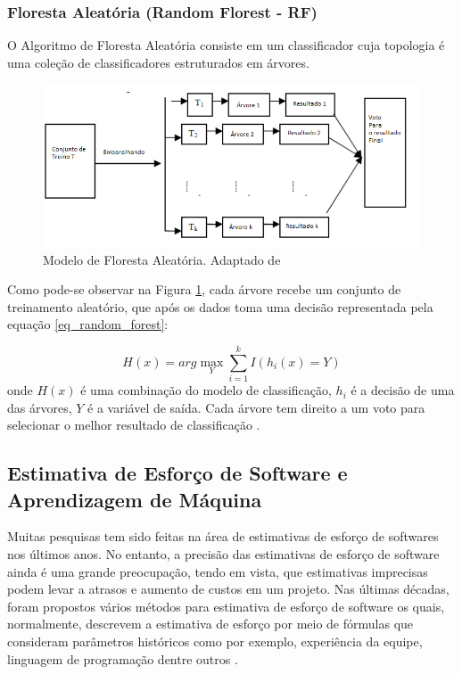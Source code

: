 \documentclass[12pt]{article}
\begin{document}
\subsubsection{Floresta Aleatória (Random Florest - RF)}

O Algoritmo de Floresta Aleatória consiste em um classificador cuja topologia é uma coleção de classificadores estruturados em árvores.

\begin{figure}[h]
  \centering
  \includegraphics[width=.6\textwidth]{img/fig_random_forest.png}
  \caption{Modelo de Floresta Aleatória. Adaptado de \cite{liuetal:2012}}
  \label{fig_random_forest}
\end{figure}

Como pode-se observar na Figura \ref{fig_random_forest}, cada árvore recebe um conjunto de treinamento aleatório, que após os dados toma uma decisão representada pela equação \ref{eq_random_forest}:

\begin{equation}
  H(x) = arg \max_Y \sum_{i = 1}^{k} I (h_i(x) = Y)
  \label{eq_random_forest}
\end{equation}
onde $H(x)$ é uma combinação do modelo de classificação, $h_i$ é a decisão de uma das árvores, $Y$ é a variável de saída. Cada árvore tem direito a um voto para selecionar o melhor resultado de classificação \cite{liuetal:2012}.


\subsection{Estimativa de Esforço de Software e Aprendizagem de Máquina}

Muitas pesquisas tem sido feitas na área de estimativas de esforço de softwares nos últimos anos. No entanto, a precisão das estimativas de esforço de software ainda é uma grande preocupação, tendo em vista, que estimativas imprecisas podem levar a atrasos e aumento de custos em um projeto. Nas últimas décadas, foram propostos vários métodos para estimativa de esforço de software os quais, normalmente, descrevem a estimativa de esforço por meio de fórmulas que consideram parâmetros históricos como por exemplo, experiência da equipe, linguagem de programação dentre outros \cite{asadegravino:2019}.
\end{document}
